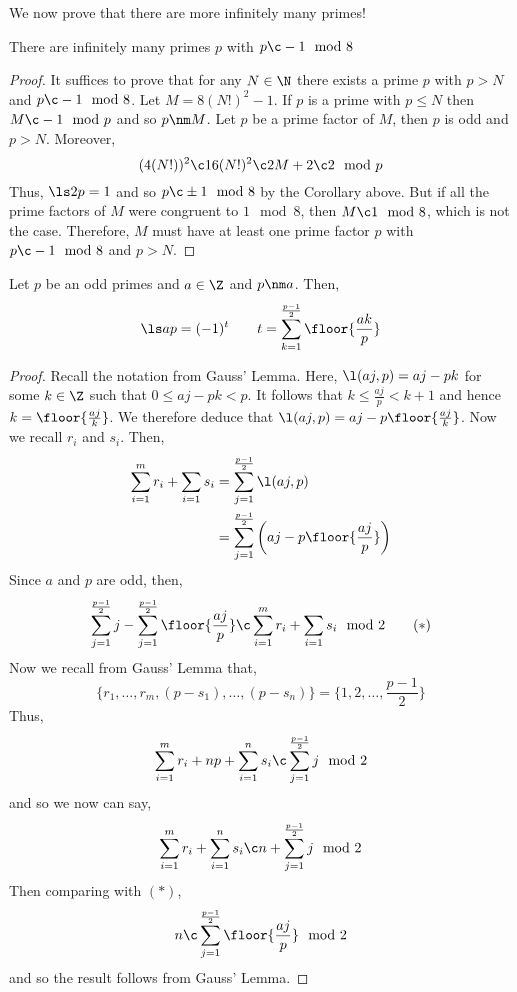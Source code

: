We now prove that there are more infinitely many primes!
\begin{nthm}
  There are infinitely many primes $p$ with $p \c -1 \mod 8$
\end{nthm}
\begin{proof}
  It suffices to prove that for any $N \in \N$ there exists a prime $p$ with $p > N$ and $p \c -1 \mod 8$. Let $M = 8(N!)^2 - 1$. If $p$ is a prime with $p \le N$ then $M \c -1 \mod p$ and so $p \nm M$. Let $p$ be a prime factor of $M$, then $p$ is odd and $p > N$. Moreover,
  $$ (4(N!))^2 \c 16(N!)^2 \c 2M + 2 \c 2 \mod p $$
  Thus, $\ls 2 p = 1$ and so $p \c \pm 1\mod 8$ by the Corollary above. But if all the prime factors of $M$ were congruent to $1 \mod 8$, then $M \c 1 \mod 8$, which is not the case. Therefore, $M$ must have at least one prime factor $p$ with $p \c -1 \mod 8$ and $p > N$.
\end{proof}

\begin{nlemma}
  Let $p$ be an odd primes and $a \in \Z$ and $p \nm a$. Then,
  $$ \ls a p = (-1)^t  \qquad t = \sum_{k=1}^\frac{p-1}{2} \floor{\frac{ak}{p}}$$
\end{nlemma}
\begin{proof}
  Recall the notation from Gauss' Lemma. Here, $\l(aj, p) = aj - pk$ for some $k \in \Z$ such that $0 \le aj - pk < p$. It follows that $k \le \frac{aj}{p} < k+1$ and hence $k = \floor{\frac{aj}{k}}$. We therefore deduce that $\l(aj, p) = aj - p \floor{\frac{aj}{k}}$. Now we recall $r_i$ and $s_i$. Then,
  \begin{align*}
    \sum_{i=1}^m r_i + \sum_{i=1} s_i &= \sum_{j=1}^{\frac{p-1}{2}} \l(aj, p)\\
    &= \sum_{j=1}^{\frac{p-1}{2}} \left( aj - p\floor{\frac{aj}{p}} \right)
  \end{align*}
  Since $a$ and $p$ are odd, then,
  \begin{equation}
    \sum_{j=1}^{\frac{p-1}{2}} j - \sum_{j=1}^{\frac{p-1}{2}}\floor{\frac{aj}{p}} \c \sum_{i=1}^m r_i + \sum_{i=1} s_i \mod 2 \tag{$*$}
  \end{equation}
  Now we recall from Gauss' Lemma that,
  $$ \{r_1, \dots, r_m, (p - s_1), \dots, (p - s_n)\} = \{1, 2, \dots, \frac{p-1}{2}\} $$
  Thus,
  $$ \sum_{i=1}^m r_i + np + \sum_{i=1}^n s_i \c \sum_{j=1}^{\frac{p-1}{2}} j \mod 2 $$
  and so we now can say,
  $$ \sum_{i=1}^m r_i + \sum_{i=1}^n s_i \c n +  \sum_{j=1}^{\frac{p-1}{2}} j \mod 2 $$
  Then comparing with $(*)$,
  $$ n \c \sum_{j=1}^{\frac{p-1}{2}}\floor{\frac{aj}{p}} \mod 2 $$
  and so the result follows from Gauss' Lemma.
\end{proof}
